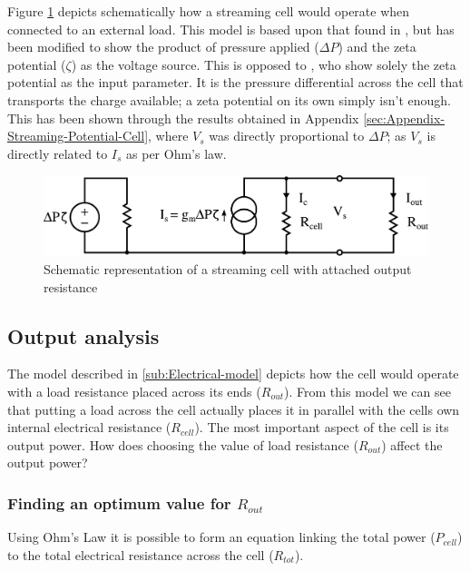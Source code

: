 Figure \ref{fig:StreamingCell_Schematic-representation} depicts schematically how a streaming cell would operate when connected to an external load.
This model is based upon that found in \cite{Olthuis2005}, but has been modified to show the product of pressure applied ($\Delta P$) and the zeta potential ($\zeta$) as the voltage source.
This is opposed to \cite{Olthuis2005}, who show solely the zeta potential as the input parameter.
It is the pressure differential across the cell that transports the charge available; a zeta potential on its own simply isn't enough.
This has been shown through the results obtained in Appendix \ref{sec:Appendix-Streaming-Potential-Cell}, where $V_{s}$ was directly proportional to $\Delta P$; as $V_{s}$ is directly related to $I_{s}$ as per Ohm's law.

\begin{figure}
    \centering
        \includegraphics[width=\textwidth]{content/pt1/01-PowerHarvesting/graphics/StreamingCell_EquivalentCircuit_output}
    \caption{\label{fig:StreamingCell_Schematic-representation}Schematic representation of a streaming cell with attached output resistance}
\end{figure}



\subsection{Output analysis}

The model described in \ref{sub:Electrical-model} depicts how the cell would operate with a load resistance placed across its ends ($R_{out}$).
From this model we can see that putting a load across the cell actually places it in parallel with the cells own internal electrical resistance ($R_{cell}$).
The most important aspect of the cell is its output power.
How does choosing the value of load resistance ($R_{out}$) affect the output power?


\subsubsection*{Finding an optimum value for $R_{out}$}

Using Ohm's Law it is possible to form an equation linking the total power ($P_{cell}$) to the total electrical resistance across the cell ($R_{tot}$).

